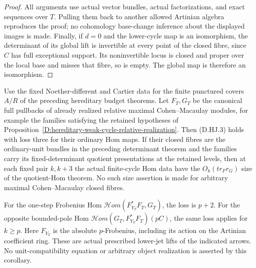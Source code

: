 \begin{proof}
All arguments use actual vector bundles, actual factorizations,
and exact sequences over $T$. Pulling them back to another
allowed Artinian algebra reproduces the proof; no cohomology
base-change inference about the displayed images is made.
Finally, if $d=0$ and the lower-cycle map is an isomorphism,
the determinant of its global lift is invertible at every
point of the closed fibre, since $C$ has full exceptional
support. Its noninvertible locus is closed and proper over
the local base and misses that fibre, so is empty. The
global map is therefore an isomorphism.
\end{proof}

\begin{corollary}
\label{D:hereditary-canonical-Hom-arrow-window}
Use the fixed Noether-different and Cartier data for the
finite punctured covers $A/R$ of the preceding hereditary
budget theorems. Let $F_T,G_T$ be the canonical full pullbacks
of already realized relative maximal Cohen--Macaulay modules,
for example the families satisfying the retained hypotheses
of Proposition~\ref{D:hereditary-weak-cycle-relative-realization}.
Then (D.HJ.3) holds with loss three for their ordinary Hom
maps. If their closed fibres are the ordinary-unit bundles
in the preceding determinant theorem and the families carry
its fixed-determinant quotient presentations at the retained
levels, then at each fixed pair $k,k+3$ the actual finite-cycle
Hom data have the $O_k(tr_Fr_G)$ size of the quotient-Hom
theorem. No such size assertion is made for arbitrary
maximal Cohen--Macaulay closed fibres.

For the one-step Frobenius Hom
$\mathcal Hom(F_{Y_T}^*F_T,G_T)$, the loss is $p+2$.
For the opposite bounded-pole Hom
$\mathcal Hom(G_T,F_{Y_T}^*F_T)(pC)$, the same loss applies
for $k\ge p$. Here $F_{Y_T}$ is the absolute $p$-Frobenius,
including its action on the Artinian coefficient ring.
These are actual prescribed lower-jet lifts of the indicated
arrows. No unit-compatibility equation or arbitrary object
realization is asserted by this corollary.
\end{corollary}

